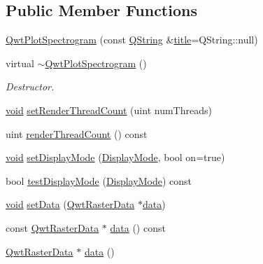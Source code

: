 \subsection*{Public Member Functions}
\begin{DoxyCompactItemize}
\item 
\hyperlink{class_qwt_plot_spectrogram_ae90c0431be329ecbefc7ed9ac77f5ed6}{Qwt\-Plot\-Spectrogram} (const \hyperlink{group___u_a_v_objects_plugin_gab9d252f49c333c94a72f97ce3105a32d}{Q\-String} \&\hyperlink{class_qwt_plot_item_a3859d011b670b5f89e45d1ccef9206f7}{title}=Q\-String\-::null)
\item 
virtual \hyperlink{class_qwt_plot_spectrogram_ae76415d290cf4a512d07a17260b7a84a}{$\sim$\-Qwt\-Plot\-Spectrogram} ()
\begin{DoxyCompactList}\small\item\em Destructor. \end{DoxyCompactList}\item 
\hyperlink{group___u_a_v_objects_plugin_ga444cf2ff3f0ecbe028adce838d373f5c}{void} \hyperlink{class_qwt_plot_spectrogram_ad6add855f2a9dff26541c918ce57749e}{set\-Render\-Thread\-Count} (uint num\-Threads)
\item 
uint \hyperlink{class_qwt_plot_spectrogram_a447a83077c8b9cb02e7b179b2e9a1138}{render\-Thread\-Count} () const 
\item 
\hyperlink{group___u_a_v_objects_plugin_ga444cf2ff3f0ecbe028adce838d373f5c}{void} \hyperlink{class_qwt_plot_spectrogram_a482a82bcf1b9f2a9a75f527063b394a2}{set\-Display\-Mode} (\hyperlink{class_qwt_plot_spectrogram_a7f4904fe68b442d0f93040ea1fa1d062}{Display\-Mode}, bool on=true)
\item 
bool \hyperlink{class_qwt_plot_spectrogram_a292ec25eb59adaedf90eef45e98f4d38}{test\-Display\-Mode} (\hyperlink{class_qwt_plot_spectrogram_a7f4904fe68b442d0f93040ea1fa1d062}{Display\-Mode}) const 
\item 
\hyperlink{group___u_a_v_objects_plugin_ga444cf2ff3f0ecbe028adce838d373f5c}{void} \hyperlink{class_qwt_plot_spectrogram_a5ee036cdf8dbaf5f8fd82a3fc47b023a}{set\-Data} (\hyperlink{class_qwt_raster_data}{Qwt\-Raster\-Data} $\ast$\hyperlink{glext_8h_a8850df0785e6fbcc2351af3b686b8c7a}{data})
\item 
const \hyperlink{class_qwt_raster_data}{Qwt\-Raster\-Data} $\ast$ \hyperlink{class_qwt_plot_spectrogram_a52d6090388ad9ff1117f3c4075903814}{data} () const 
\item 
\hyperlink{class_qwt_raster_data}{Qwt\-Raster\-Data} $\ast$ \hyperlink{class_qwt_plot_spectrogram_a4082962ff60af18a5212ea160f7b55ba}{data} ()

\end{DoxyCompactItemize}
